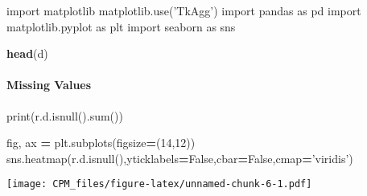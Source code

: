 \documentclass[]{article}
\newenvironment{Shaded}{\begin{snugshade}}{\end{snugshade}}
\newcommand{\BuiltInTok}[1]{#1}
\newcommand{\DecValTok}[1]{\textcolor[rgb]{0.00,0.00,0.81}{#1}}
\newcommand{\ImportTok}[1]{#1}
\newcommand{\KeywordTok}[1]{\textcolor[rgb]{0.13,0.29,0.53}{\textbf{#1}}}
\newcommand{\NormalTok}[1]{#1}
\newcommand{\OperatorTok}[1]{\textcolor[rgb]{0.81,0.36,0.00}{\textbf{#1}}}
\newcommand{\StringTok}[1]{\textcolor[rgb]{0.31,0.60,0.02}{#1}}
\newcommand{\VariableTok}[1]{\textcolor[rgb]{0.00,0.00,0.00}{#1}}
\let\oldparagraph\paragraph
\renewcommand{\paragraph}[1]{\oldparagraph{#1}\mbox{}}
\begin{document}
\begin{Shaded}
\begin{Highlighting}[]
\ImportTok{import}\NormalTok{ matplotlib}
\NormalTok{matplotlib.use(}\StringTok{'TkAgg'}\NormalTok{)}
\ImportTok{import}\NormalTok{ pandas }\ImportTok{as}\NormalTok{ pd}
\ImportTok{import}\NormalTok{ matplotlib.pyplot }\ImportTok{as}\NormalTok{ plt}
\ImportTok{import}\NormalTok{ seaborn }\ImportTok{as}\NormalTok{ sns}
\end{Highlighting}
\end{Shaded}

\begin{Shaded}
\begin{Highlighting}[]
\KeywordTok{head}\NormalTok{(d)}
\end{Highlighting}
\end{Shaded}

\hypertarget{missing-values}{%
\paragraph{Missing Values}\label{missing-values}}

\begin{Shaded}
\end{Shaded}

\begin{Shaded}
\begin{Highlighting}[]
\BuiltInTok{print}\NormalTok{(r.d.isnull().}\BuiltInTok{sum}\NormalTok{())}
\end{Highlighting}
\end{Shaded}

\begin{Shaded}
\begin{Highlighting}[]
\NormalTok{fig, ax }\OperatorTok{=}\NormalTok{ plt.subplots(figsize}\OperatorTok{=}\NormalTok{(}\DecValTok{14}\NormalTok{,}\DecValTok{12}\NormalTok{))}
\NormalTok{sns.heatmap(r.d.isnull(),yticklabels}\OperatorTok{=}\VariableTok{False}\NormalTok{,cbar}\OperatorTok{=}\VariableTok{False}\NormalTok{,cmap}\OperatorTok{=}\StringTok{'viridis'}\NormalTok{) }
\end{Highlighting}
\end{Shaded}

\texttt{[image: CPM\_files/figure-latex/unnamed-chunk-6-1.pdf]}
\end{document}
